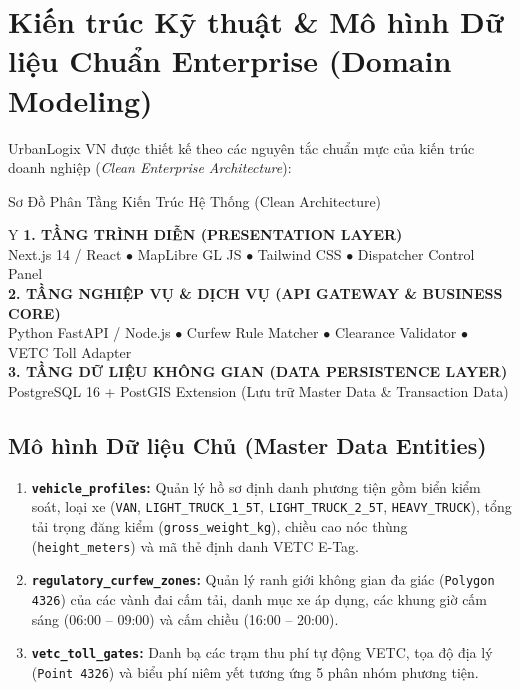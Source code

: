 \documentclass[11pt,a4paper]{article}
\begin{document}
\section{Kiến trúc Kỹ thuật \& Mô hình Dữ liệu Chuẩn Enterprise (Domain Modeling)}

UrbanLogix VN được thiết kế theo các nguyên tắc chuẩn mực của kiến trúc doanh nghiệp (\textit{Clean Enterprise Architecture}):

\begin{calloutbox}[secondary]{Sơ Đồ Phân Tầng Kiến Trúc Hệ Thống (Clean Architecture)}
  \begin{tabularx}{\textwidth}{Y}
    \textbf{\color{primary}1. TẦNG TRÌNH DIỄN (PRESENTATION LAYER)} \\
    \small Next.js 14 / React $\bullet$ MapLibre GL JS $\bullet$ Tailwind CSS $\bullet$ Dispatcher Control Panel \\
    \midrule
    \textbf{\color{primary}2. TẦNG NGHIỆP VỤ \& DỊCH VỤ (API GATEWAY \& BUSINESS CORE)} \\
    \small Python FastAPI / Node.js $\bullet$ Curfew Rule Matcher $\bullet$ Clearance Validator $\bullet$ VETC Toll Adapter \\
    \midrule
    \textbf{\color{primary}3. TẦNG DỮ LIỆU KHÔNG GIAN (DATA PERSISTENCE LAYER)} \\
    \small PostgreSQL 16 + PostGIS Extension (Lưu trữ Master Data \& Transaction Data) \\
  \end{tabularx}
\end{calloutbox}

\subsection{Mô hình Dữ liệu Chủ (Master Data Entities)}
\begin{enumerate}
  \item \textbf{\texttt{vehicle\_profiles}:} Quản lý hồ sơ định danh phương tiện gồm biển kiểm soát, loại xe (\texttt{VAN}, \texttt{LIGHT\_TRUCK\_1\_5T}, \texttt{LIGHT\_TRUCK\_2\_5T}, \texttt{HEAVY\_TRUCK}), tổng tải trọng đăng kiểm (\texttt{gross\_weight\_kg}), chiều cao nóc thùng (\texttt{height\_meters}) và mã thẻ định danh VETC E-Tag.
  \item \textbf{\texttt{regulatory\_curfew\_zones}:} Quản lý ranh giới không gian đa giác (\texttt{Polygon 4326}) của các vành đai cấm tải, danh mục xe áp dụng, các khung giờ cấm sáng (06:00 -- 09:00) và cấm chiều (16:00 -- 20:00).
  \item \textbf{\texttt{vetc\_toll\_gates}:} Danh bạ các trạm thu phí tự động VETC, tọa độ địa lý (\texttt{Point 4326}) và biểu phí niêm yết tương ứng 5 phân nhóm phương tiện.
\end{enumerate}
\end{document}
